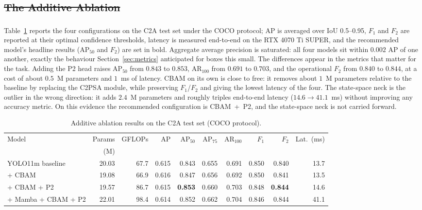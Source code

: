 \documentclass[12pt,a4paper,oneside]{report}
\providecommand{\DIFadd}[1]{{\protect\color{blue}\uwave{#1}}} %
\providecommand{\DIFdel}[1]{{\protect\color{red}\sout{#1}}}                      %
\providecommand{\DIFaddbegin}{} %
\providecommand{\DIFaddend}{} %
\providecommand{\DIFdelbegin}{} %
\providecommand{\DIFdelend}{} %
\begin{document}
\DIFdelbegin \subsection{\DIFdel{The Additive Ablation}}
\addtocounter{subsection}{-1}%
\DIFdelend \DIFaddbegin \subsubsection{\DIFadd{The Additive Ablation}}
\DIFaddend Table~\ref{tab:main} reports the four configurations on the C2A test set
under the COCO protocol; AP is averaged over IoU 0.5--0.95, $F_1$ and $F_2$
are reported at their optimal confidence thresholds, latency is measured
end-to-end on the RTX 4070 Ti SUPER, and the recommended model's headline
results ($\mathrm{AP}_{50}$ and $F_2$) are set in bold. Aggregate average
precision is saturated: all
four models sit within $0.002$ AP of one another, exactly the behaviour
Section~\ref{sec:metrics} anticipated for boxes this small. The differences
appear in the metrics that matter for the task. Adding the P2 head raises
$\mathrm{AP}_{50}$ from $0.843$ to $0.853$, $\mathrm{AR}_{100}$ from $0.691$
to $0.703$, and the operational $F_2$ from $0.840$ to $0.844$, at a cost of
about $0.5$~M parameters and $1$~ms of latency. CBAM on its own is close to
free: it removes about $1$~M parameters relative to the baseline by replacing
the C2PSA module, while preserving $F_1$/$F_2$ and giving the lowest latency
of the four. The state-space neck
is the outlier in the wrong direction: it adds $2.4$~M parameters and
roughly triples end-to-end latency ($14.6 \to 41.1$~ms) without improving
any accuracy metric. On this evidence the recommended configuration is
CBAM~+~P2, and the state-space neck is not carried forward.

\begin{table}[tbp]
  \centering
  \caption{Additive ablation results on the C2A test set (COCO protocol).}
  \label{tab:main}
  \small
  \setlength{\tabcolsep}{3pt}
  \begin{tabular}{@{}l r r r r r r r r r@{}}
    \toprule
    Model & Params & GFLOPs & AP & $\mathrm{AP}_{50}$ & $\mathrm{AP}_{75}$ & $\mathrm{AR}_{100}$ & $F_1$ & $F_2$ & Lat.\ (ms) \\
    & (M) & & & & & & & & \\
    \midrule
    YOLO11m baseline    & 20.03 & 67.7 & 0.615 & 0.843 & 0.655 & 0.691 & 0.850 & 0.840 & 13.7 \\
    + CBAM              & 19.08 & 66.9 & 0.616 & 0.847 & 0.656 & 0.692 & 0.850 & 0.841 & 13.5 \\
    + CBAM + P2         & 19.57 & 86.7 & 0.615 & \textbf{0.853} & 0.660 & 0.703 & 0.848 & \textbf{0.844} & 14.6 \\
    + Mamba + CBAM + P2 & 22.01 & 98.4 & 0.614 & 0.852 & 0.662 & 0.704 & 0.846 & 0.844 & 41.1 \\
    \bottomrule
  \end{tabular}
\end{table}
\end{document}
